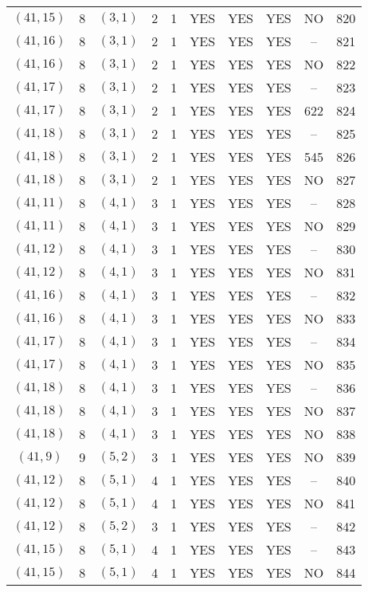 \begin{longtable}{|c|c|c|c|c|c|c|c|c|c|}
$(41, 15)$ & 8 & $(3, 1)$ & 2 & 1 & YES & YES & YES & NO & 820\\
$(41, 16)$ & 8 & $(3, 1)$ & 2 & 1 & YES & YES & YES & -- & 821\\
$(41, 16)$ & 8 & $(3, 1)$ & 2 & 1 & YES & YES & YES & NO & 822\\
$(41, 17)$ & 8 & $(3, 1)$ & 2 & 1 & YES & YES & YES & -- & 823\\
$(41, 17)$ & 8 & $(3, 1)$ & 2 & 1 & YES & YES & YES & 622 & 824\\
$(41, 18)$ & 8 & $(3, 1)$ & 2 & 1 & YES & YES & YES & -- & 825\\
$(41, 18)$ & 8 & $(3, 1)$ & 2 & 1 & YES & YES & YES & 545 & 826\\
$(41, 18)$ & 8 & $(3, 1)$ & 2 & 1 & YES & YES & YES & NO & 827\\
$(41, 11)$ & 8 & $(4, 1)$ & 3 & 1 & YES & YES & YES & -- & 828\\
$(41, 11)$ & 8 & $(4, 1)$ & 3 & 1 & YES & YES & YES & NO & 829\\
$(41, 12)$ & 8 & $(4, 1)$ & 3 & 1 & YES & YES & YES & -- & 830\\
$(41, 12)$ & 8 & $(4, 1)$ & 3 & 1 & YES & YES & YES & NO & 831\\
$(41, 16)$ & 8 & $(4, 1)$ & 3 & 1 & YES & YES & YES & -- & 832\\
$(41, 16)$ & 8 & $(4, 1)$ & 3 & 1 & YES & YES & YES & NO & 833\\
$(41, 17)$ & 8 & $(4, 1)$ & 3 & 1 & YES & YES & YES & -- & 834\\
$(41, 17)$ & 8 & $(4, 1)$ & 3 & 1 & YES & YES & YES & NO & 835\\
$(41, 18)$ & 8 & $(4, 1)$ & 3 & 1 & YES & YES & YES & -- & 836\\
$(41, 18)$ & 8 & $(4, 1)$ & 3 & 1 & YES & YES & YES & NO & 837\\
$(41, 18)$ & 8 & $(4, 1)$ & 3 & 1 & YES & YES & YES & NO & 838\\
$(41, 9)$ & 9 & $(5, 2)$ & 3 & 1 & YES & YES & YES & NO & 839\\
$(41, 12)$ & 8 & $(5, 1)$ & 4 & 1 & YES & YES & YES & -- & 840\\
$(41, 12)$ & 8 & $(5, 1)$ & 4 & 1 & YES & YES & YES & NO & 841\\
$(41, 12)$ & 8 & $(5, 2)$ & 3 & 1 & YES & YES & YES & -- & 842\\
$(41, 15)$ & 8 & $(5, 1)$ & 4 & 1 & YES & YES & YES & -- & 843\\
$(41, 15)$ & 8 & $(5, 1)$ & 4 & 1 & YES & YES & YES & NO & 844\\

\end{longtable}

